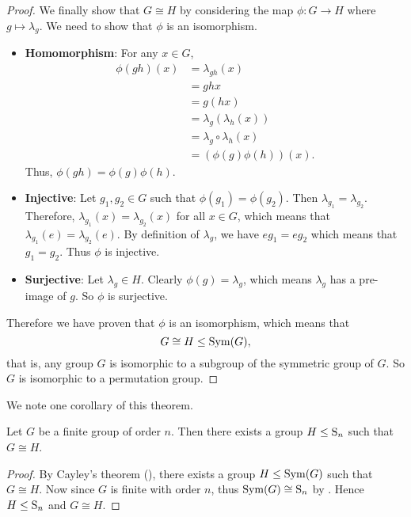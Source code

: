 \begin{proof}
    We finally show that $G \cong H$ by considering the map $\phi: G\to H$ where $g \mapsto \lambda_g$. We need to show that $\phi$ is an isomorphism.
    \begin{itemize}
        \item \textbf{Homomorphism}: For any $x \in G$,
            \begin{align*}
                \phi(gh)(x) &= \lambda_{gh}(x)\\
                &= ghx\\
                &= g(hx)\\
                &= \lambda_g\left(\lambda_h(x)\right)\\
                &= \lambda_g\circ\lambda_h(x)\\
                &= (\phi(g)\phi(h))(x).
            \end{align*}
            Thus, $\phi(gh) = \phi(g)\phi(h)$.

        \item \textbf{Injective}: Let $g_1, g_2 \in G$ such that $\phi(g_1) = \phi(g_2)$. Then $\lambda_{g_1} = \lambda_{g_2}$. Therefore, $\lambda_{g_1}(x) = \lambda_{g_2}(x)$ for all $x \in G$, which means that $\lambda_{g_1}(e) = \lambda_{g_2}(e)$. By definition of $\lambda_g$, we have $eg_1 = eg_2$ which means that $g_1=g_2$. Thus $\phi$ is injective.

        \item \textbf{Surjective}: Let $\lambda_g \in H$. Clearly $\phi(g) = \lambda_g$, which means $\lambda_g$ has a pre-image of $g$. So $\phi$ is surjective.
    \end{itemize}
    Therefore we have proven that $\phi$ is an isomorphism, which means that
    \[
        G \cong H \leq \mathrm{Sym}(G),
    \]
    that is, any group $G$ is isomorphic to a subgroup of the symmetric group of $G$. So $G$ is isomorphic to a permutation group.
\end{proof}

We note one corollary of this theorem.
\begin{corollary}
    Let $G$ be a finite group of order $n$. Then there exists a group $H \leq \mathrm{S}_{n}$ such that $G \cong H$.
\end{corollary}
\begin{proof}
    By Cayley's theorem (), there exists a group $H \leq \mathrm{Sym}(G)$ such that $G \cong H$. Now since $G$ is finite with order $n$, thus $\mathrm{Sym}(G) \cong \mathrm{S}_{n}$ by . Hence $H \leq \mathrm{S}_{n}$ and $G \cong H$.
\end{proof}

